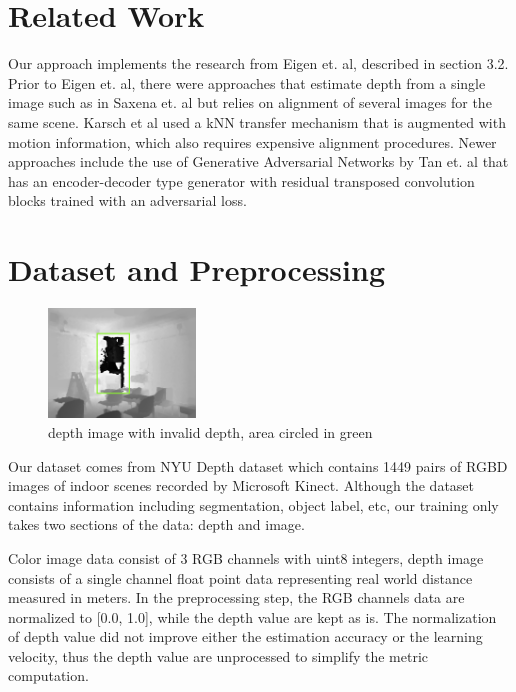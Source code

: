 \documentclass{article}
\begin{document}
\section{Related Work}
    Our approach implements the research from Eigen et. al\cite{nips-1}, described in section 3.2. Prior to Eigen et. al\cite{nips-1}, there were approaches that estimate depth from a single image such as in Saxena et. al\cite{pp5} but relies on alignment of several images for the same scene.  Karsch et al\cite{pp7} used a kNN transfer mechanism that is augmented with motion information, which also requires expensive alignment procedures. Newer approaches include the use of Generative Adversarial Networks by Tan et. al\cite{pp6} that has an encoder-decoder type generator with residual transposed convolution blocks trained with an adversarial loss. 

\section{Dataset and Preprocessing}
    
\begin{figure}
    \centering
    \includegraphics[width=0.35\textwidth]{images/depth_with_invalid.png}
    \caption{depth image with invalid depth, area circled in green}
    \label{fig:invalid_depth}
\end{figure}
    
    Our dataset comes from NYU Depth dataset \cite{nyu_dataset} which contains 1449 pairs of RGBD images of indoor scenes recorded by Microsoft Kinect. Although the dataset contains information including segmentation, object label, etc, our training only takes two sections of the data: depth and image.

    Color image data consist of 3 RGB channels with uint8 integers, depth image consists of a single channel float point data representing real world distance measured in meters. In the preprocessing step, the RGB channels data are normalized to [0.0, 1.0], while the depth value are kept as is. The normalization of depth value did not improve either the estimation accuracy or the learning velocity, thus the depth value are unprocessed to simplify the metric computation.
    
\end{document}
